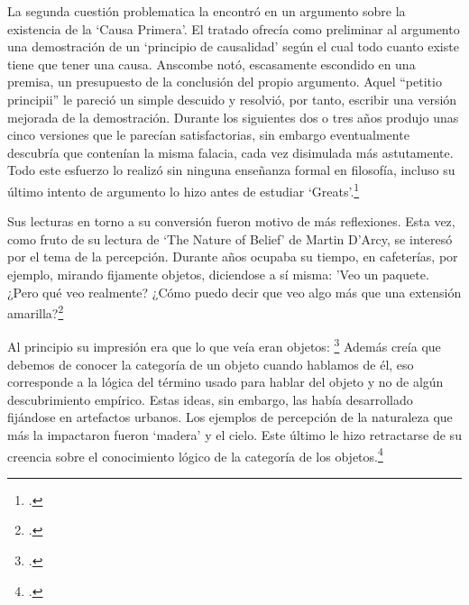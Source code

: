 La segunda cuestión problematica la encontró en un argumento sobre la existencia
de la `Causa Primera'. El tratado ofrecía como preliminar al argumento una
demostración de un `principio de causalidad' según el cual todo cuanto existe
tiene que tener una causa. Anscombe notó, escasamente escondido en una premisa,
un presupuesto de la conclusión del propio argumento. Aquel ``petitio
principii'' le pareció un simple descuido y resolvió, por tanto, escribir una
versión mejorada de la demostración. Durante los siguientes dos o tres años
produjo unas cinco versiones que le parecían satisfactorias, sin embargo
eventualmente descubría que contenían la misma falacia, cada vez disimulada más
astutamente. Todo este esfuerzo lo realizó sin ninguna enseñanza formal en
filosofía, incluso su último intento de argumento lo hizo antes de estudiar
`Greats'.\footcite[cf.~][p.~vii \S2]{M&PotM}


Sus lecturas en torno a su conversión fueron motivo de más reflexiones. Esta
vez, como fruto de su lectura de `The Nature of Belief' de Martin D'Arcy, se
interesó por el tema de la percepción. Durante años ocupaba su tiempo, en
cafeterías, por ejemplo, mirando fijamente objetos, diciendose a sí misma: 'Veo
un paquete. ¿Pero qué veo realmente? ¿Cómo puedo decir que veo algo más que una
extensión amarilla?\footcite[cf.~][p.~viii \S1]{M&PotM}

Al principio su impresión era que lo que veía eran objetos:
\footcite[p.~viii \S1]{M&PotM} Además creía que debemos de conocer la
categoría de un objeto cuando hablamos de él, eso corresponde a la lógica del
término usado para hablar del objeto y no de algún descubrimiento empírico.
Estas ideas, sin embargo, las había desarrollado fijándose en artefactos
urbanos. Los ejemplos de percepción de la naturaleza que más la impactaron
fueron `madera' y el cielo. Este último le hizo retractarse de su creencia sobre
el conocimiento lógico de la categoría de los objetos.\footcite[cf.~][p.~viii
\S1]{M&PotM}

